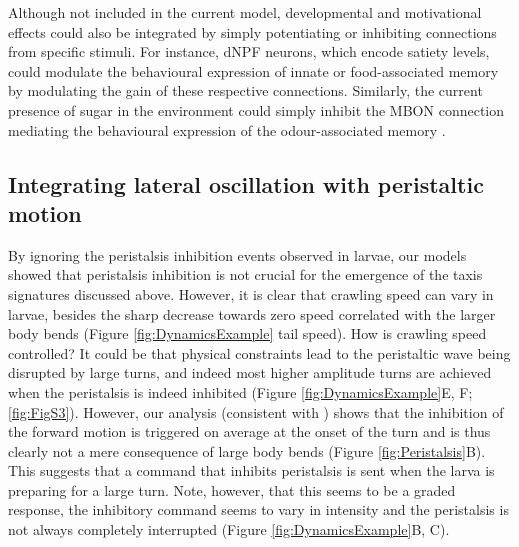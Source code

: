 \documentclass[11pt,a4paper]{article}
\newcommand{\todoBW}[1]{\todo[author=BW,color=orange, size=\tiny,inline]{#1}}
\begin{document}
Although not included in the current model, developmental \citep{gong2010two,wu2003developmental} and motivational \citep{krashes2009neural} %
 effects could also be integrated by simply potentiating or inhibiting connections from specific stimuli. For instance, dNPF neurons, which encode satiety levels, could modulate the behavioural expression of innate or food-associated memory \citep{krashes2009neural}  by modulating the gain of these respective connections. Similarly, the current presence of sugar in the environment could simply inhibit the MBON connection mediating the behavioural expression of the odour-associated memory \citep{schleyer2011behavior}.

\subsection{Integrating lateral oscillation with peristaltic motion}
By ignoring the peristalsis inhibition events observed in larvae, our models showed that peristalsis inhibition is not crucial for the emergence of the taxis signatures discussed above. However, it is clear that crawling speed can vary in larvae, besides the sharp decrease towards zero speed correlated with the larger body bends (Figure \ref{fig:DynamicsExample} tail speed). How is crawling speed controlled? It could be that physical constraints lead to the peristaltic wave being disrupted by large turns, and indeed most higher amplitude turns are achieved when the peristalsis is indeed inhibited (Figure \ref{fig:DynamicsExample}E, F; \ref{fig:FigS3}). However, our analysis (consistent with \citet{hernandez2015reverse}) shows that the inhibition of the forward motion is triggered on average at the onset of the turn and is thus clearly not a mere consequence of large body bends (Figure \ref{fig:Peristalsis}B). This suggests that a  command that inhibits peristalsis is sent when the larva is preparing for a large turn. Note, however, that this seems to be a graded response, the inhibitory command seems to vary in intensity and the peristalsis is not always completely interrupted (Figure \ref{fig:DynamicsExample}B, C).
\end{document}
